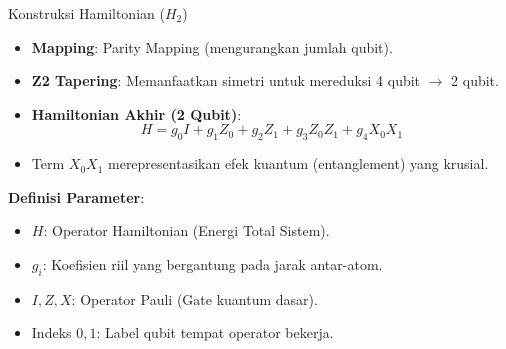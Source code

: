 \documentclass[aspectratio=169, 10pt]{beamer}
\begin{document}
\begin{frame}{Konstruksi Hamiltonian ($H_2$)}
    \begin{itemize}
        \item \textbf{Mapping}: Parity Mapping (mengurangkan jumlah qubit).
        \item \textbf{Z2 Tapering}: Memanfaatkan simetri untuk mereduksi 4 qubit $\rightarrow$ 2 qubit.
        \item \textbf{Hamiltonian Akhir (2 Qubit)}:
        \begin{equation}
            H = g_0 I + g_1 Z_0 + g_2 Z_1 + g_3 Z_0 Z_1 + g_4 X_0 X_1
        \end{equation}
        \item Term $X_0 X_1$ merepresentasikan efek kuantum (entanglement) yang krusial.
    \end{itemize}
    \vspace{0.3cm}
    \textbf{Definisi Parameter}:
    \footnotesize
    \begin{itemize}
        \item $H$: Operator Hamiltonian (Energi Total Sistem).
        \item $g_i$: Koefisien riil yang bergantung pada jarak antar-atom.
        \item $I, Z, X$: Operator Pauli (Gate kuantum dasar).
        \item Indeks $0, 1$: Label qubit tempat operator bekerja.
    \end{itemize}
\end{frame}
\end{document}
